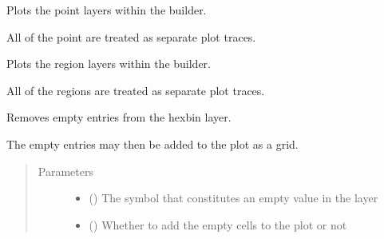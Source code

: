 \documentclass[letterpaper,10pt,english]{sphinxmanual}
\begin{document}
\begin{fulllineitems}
\begin{fulllineitems}
\label{\detokenize{builder:geohexviz.builder.PlotBuilder.plot_points}}
\sphinxAtStartPar
Plots the point layers within the builder.

\sphinxAtStartPar
All of the point are treated as separate plot traces.

\end{fulllineitems}


\begin{fulllineitems}
\label{\detokenize{builder:geohexviz.builder.PlotBuilder.plot_regions}}
\sphinxAtStartPar
Plots the region layers within the builder.

\sphinxAtStartPar
All of the regions are treated as separate plot traces.

\end{fulllineitems}


\begin{fulllineitems}
\label{\detokenize{builder:geohexviz.builder.PlotBuilder.remove_empties}}
\sphinxAtStartPar
Removes empty entries from the hexbin layer.

\sphinxAtStartPar
The empty entries may then be added to the plot as a grid.
\begin{quote}\begin{description}
\item[{Parameters}] \leavevmode\begin{itemize}
\item {} 
\sphinxAtStartPar
{} () \textendash{} The symbol that constitutes an empty value in the layer

\item {} 
\sphinxAtStartPar
{} () \textendash{} Whether to add the empty cells to the plot or not


\end{itemize}
\end{description}
\end{quote}
\end{fulllineitems}
\end{fulllineitems}
\end{document}
